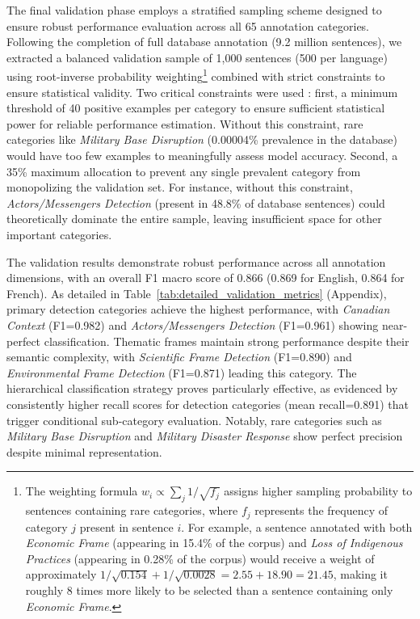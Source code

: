 \documentclass[12pt]{article}
\begin{document}
The final validation phase employs a stratified sampling scheme designed to ensure robust performance evaluation across all 65 annotation categories. Following the completion of full database annotation (9.2 million sentences), we extracted a balanced validation sample of 1,000 sentences (500 per language) using root-inverse probability weighting\footnote{The weighting formula $w_i \propto \sum_j 1/\sqrt{f_j}$ assigns higher sampling probability to sentences containing rare categories, where $f_j$ represents the frequency of category $j$ present in sentence $i$. For example, a sentence annotated with both \textit{Economic Frame} (appearing in 15.4\% of the corpus) and \textit{Loss of Indigenous Practices} (appearing in 0.28\% of the corpus) would receive a weight of approximately $1/\sqrt{0.154} + 1/\sqrt{0.0028} = 2.55 + 18.90 = 21.45$, making it roughly 8 times more likely to be selected than a sentence containing only \textit{Economic Frame}.} combined with strict constraints to ensure statistical validity. Two critical constraints were used : first, a minimum threshold of 40 positive examples per category to ensure sufficient statistical power for reliable performance estimation. Without this constraint, rare categories like \textit{Military Base Disruption} (0.00004\% prevalence in the database) would have too few examples to meaningfully assess model accuracy. Second, a 35\% maximum allocation to prevent any single prevalent category from monopolizing the validation set. For instance, without this constraint, \textit{Actors/Messengers Detection} (present in 48.8\% of database sentences) could theoretically dominate the entire sample, leaving insufficient space for other important categories.

The validation results demonstrate robust performance across all annotation dimensions, with an overall F1 macro score of 0.866 (0.869 for English, 0.864 for French). As detailed in Table~\ref{tab:detailed_validation_metrics} (Appendix), primary detection categories achieve the highest performance, with \textit{Canadian Context} (F1=0.982) and \textit{Actors/Messengers Detection} (F1=0.961) showing near-perfect classification. Thematic frames maintain strong performance despite their semantic complexity, with \textit{Scientific Frame Detection} (F1=0.890) and \textit{Environmental Frame Detection} (F1=0.871) leading this category. The hierarchical classification strategy proves particularly effective, as evidenced by consistently higher recall scores for detection categories (mean recall=0.891) that trigger conditional sub-category evaluation. Notably, rare categories such as \textit{Military Base Disruption} and \textit{Military Disaster Response} show perfect precision despite minimal representation.
\end{document}
